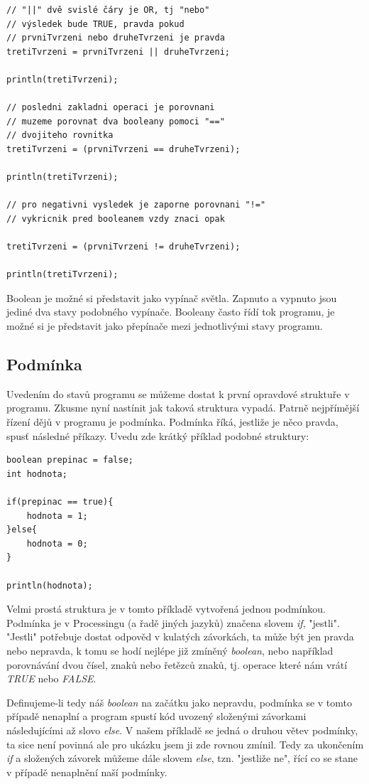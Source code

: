 \documentclass[11pt]{book}
\newcommand{\pododdil}[1]{\subsection{#1}\label{subsec:#1}}
\begin{document}
\begin{itemize}
\begin{lstlisting}
// "||" dvě svislé čáry je OR, tj "nebo"
// výsledek bude TRUE, pravda pokud
// prvniTvrzeni nebo druheTvrzeni je pravda
tretiTvrzeni = prvniTvrzeni || druheTvrzeni;

println(tretiTvrzeni);

// posledni zakladni operaci je porovnani
// muzeme porovnat dva booleany pomoci "=="
// dvojiteho rovnitka
tretiTvrzeni = (prvniTvrzeni == druheTvrzeni);

println(tretiTvrzeni);

// pro negativni vysledek je zaporne porovnani "!="
// vykricnik pred booleanem vzdy znaci opak

tretiTvrzeni = (prvniTvrzeni != druheTvrzeni);

println(tretiTvrzeni);

\end{lstlisting}

Boolean je možné si představit jako vypínač světla. Zapnuto a vypnuto jsou jediné dva stavy podobného vypínače. Booleany často řídí tok programu, je možné si je představit jako přepínače mezi jednotlivými stavy programu.

\end{itemize}

\pododdil{Podmínka}

Uvedením do stavů programu se můžeme dostat k první opravdové struktuře v programu. Zkusme nyní nastínit jak taková struktura vypadá. Patrně nejpřímější řízení dějů v programu je podmínka. Podmínka říká, jestliže je něco pravda, spusť následné příkazy. Uvedu zde krátký příklad podobné struktury:

\begin{lstlisting}
boolean prepinac = false;
int hodnota;

if(prepinac == true){
    hodnota = 1;
}else{
    hodnota = 0;
}

println(hodnota);

\end{lstlisting}

Velmi prostá struktura je v tomto příkladě vytvořená jednou podmínkou. Podmínka je v Processingu (a řadě jiných jazyků) značena slovem {\em if}, "jestli". "Jestli" potřebuje dostat odpověd v kulatých závorkách, ta může být jen pravda nebo nepravda, k tomu se hodí nejlépe již zmíněný {\em boolean}, nebo například porovnávání dvou čísel, znaků nebo řetězců znaků, tj. operace které nám vrátí {\em TRUE} nebo {\em FALSE}.

Definujeme-li tedy náš {\em boolean} na začátku jako nepravdu, podmínka se v tomto případě nenaplní a program spustí kód uvozený složenými závorkami následujícími až slovo {\em else}.
V našem příkladě se jedná o druhou větev podmínky, ta sice není povinná ale pro ukázku jsem ji zde rovnou zmínil. Tedy za ukončením {\em if} a složených závorek můžeme dále slovem {\em else}, tzn. "jestliže ne", řící co se stane v případě nenaplnění naší podmínky.
\end{document}
